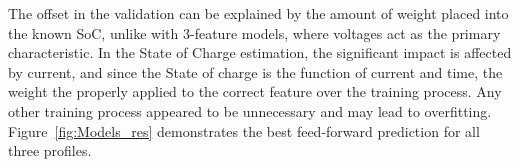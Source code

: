     The offset in the validation can be explained by the amount of weight placed into the known SoC, unlike with 3-feature models, where voltages act as the primary characteristic.
    In the State of Charge estimation, the significant impact is affected by current, and since the State of charge is the function of current and time, the weight the properly applied to the correct feature over the training process.
    Any other training process appeared to be unnecessary and may lead to overfitting.
    Figure~\ref{fig:Models_res} demonstrates the best feed-forward prediction for all three profiles.
